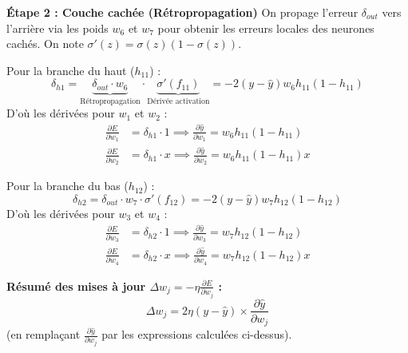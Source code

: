 {\begin{enumerate}
{			\textbf{Étape 2 : Couche cachée (Rétropropagation)}
			On propage l'erreur $\delta_{out}$ vers l'arrière via les poids $w_6$ et $w_7$ pour obtenir les erreurs locales des neurones cachés. On note $\sigma'(z) = \sigma(z)(1-\sigma(z))$.
			
			Pour la branche du haut ($h_{11}$) :
			\[ \delta_{h1} = \underbrace{\delta_{out} \cdot w_6}_{\text{Rétropropagation}} \cdot \underbrace{\sigma'(f_{11})}_{\text{Dérivée activation}} = -2(y-\hat{y}) w_6 h_{11}(1-h_{11}) \]
			D'où les dérivées pour $w_1$ et $w_2$ :
			\begin{align*}
				\frac{\partial E}{\partial w_1} &= \delta_{h1} \cdot 1 \implies \frac{\partial \hat{y}}{\partial w_1} = w_6 h_{11}(1-h_{11}) \\
				\frac{\partial E}{\partial w_2} &= \delta_{h1} \cdot x \implies \frac{\partial \hat{y}}{\partial w_2} = w_6 h_{11}(1-h_{11})x
			\end{align*}
			
			Pour la branche du bas ($h_{12}$) :
			\[ \delta_{h2} = \delta_{out} \cdot w_7 \cdot \sigma'(f_{12}) = -2(y-\hat{y}) w_7 h_{12}(1-h_{12}) \]
			D'où les dérivées pour $w_3$ et $w_4$ :
			\begin{align*}
				\frac{\partial E}{\partial w_3} &= \delta_{h2} \cdot 1 \implies \frac{\partial \hat{y}}{\partial w_3} = w_7 h_{12}(1-h_{12}) \\
				\frac{\partial E}{\partial w_4} &= \delta_{h2} \cdot x \implies \frac{\partial \hat{y}}{\partial w_4} = w_7 h_{12}(1-h_{12})x
			\end{align*}
			
			\textbf{Résumé des mises à jour $\Delta w_j = - \eta \frac{\partial E}{\partial w_j}$ :}
			\[
			\Delta w_j = 2\eta(y-\hat{y}) \times \frac{\partial \hat{y}}{\partial w_j}
			\]
			(en remplaçant $\frac{\partial \hat{y}}{\partial w_j}$ par les expressions calculées ci-dessus).
		}
	\end{enumerate}
}
